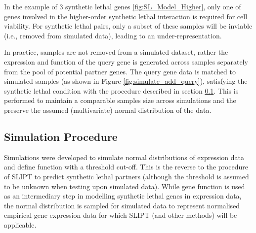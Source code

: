 In the example of 3 synthetic lethal genes \ref{fig:SL_Model_Higher}, only one of genes involved in the higher-order synthetic lethal interaction is required for cell viability. For synthetic lethal pairs, only a subset of these samples will be inviable (i.e., removed from simulated data), leading to an under-representation.

In practice, samples are not removed from a simulated dataset, rather the expression and function of the query gene is generated across samples separately from the pool of potential partner genes. The query gene data is matched to simulated samples (as shown in Figure \ref{fig:simulate_add_query}), satisfying the synthetic lethal condition with the procedure described in section \ref{methods:simulating_SL}. This is performed to maintain a comparable samples size across simulations and the preserve the assumed (multivariate) normal distribution of the data. 


\subsection{Simulation Procedure} \label{methods:simulating_SL}

Simulations were developed to simulate normal distributions of expression data and define function with a threshold cut-off. This is the reverse to the procedure of SLIPT to predict synthetic lethal partners (although the threshold is assumed to be unknown when testing upon simulated data). While gene function is used as an intermediary step in modelling synthetic lethal genes in expression data, the normal distribution is sampled for simulated data to represent normalised empirical gene expression data for which SLIPT (and other methods) will be applicable.

